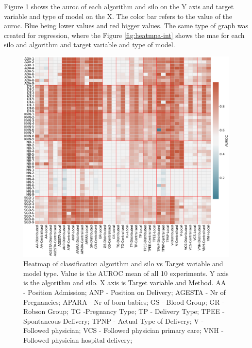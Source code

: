





Figure \ref{fig:heatmap-cat} shows the \ac{auroc} of each algorithm and silo on the Y axis and target variable and type of model on the X. The color bar refers to the value of the \ac{auroc}. Blue being lower values and red bigger values. The same type of graph was created for regression, where the Figure \ref{fig:heatmpa-int} shows the \ac{mae} for each silo and algorithm and target variable and type of model. 



\begin{figure}[h!]
\centering
\captionsetup{justification=centering}

\caption[Heatmap of classification algorithm and silo vs Target variable and model type.]{Heatmap of classification algorithm and silo vs Target variable and model type. Value is the AUROC mean of all 10 experiments. Y axis is the algorithm and silo. X axis is Target variable and Method. AA - Position Admission; ANP - Position on Delivery; AGESTA - Nr of Pregnancies; APARA - Nr of born babies; GS - Blood Group; GR - Robson Group; TG -Pregnancy Type; TP - Delivery Type; TPEE - Spontaneous Delivery; TPNP - Actual Type of Delivery; V - Followed physician; VCS - Followed physician primary care; VNH - Followed physician hospital delivery;}\label{fig:heatmap-cat} 
\includegraphics[scale=0.22]{figures/heatmap-class.png}
\end{figure}

